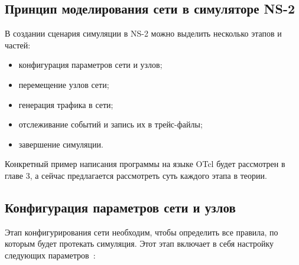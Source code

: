 \subsection{Принцип моделирования сети в симуляторе NS-2}

В создании сценария симуляции в NS-2 можно выделить несколько этапов и частей:

\begin{itemize}
  \item конфигурация параметров сети и узлов;
  \item перемещение узлов сети;
  \item генерация трафика в сети;
  \item отслеживание событий и запись их в трейс-файлы;
  \item завершение симуляции.
\end{itemize}

Конкретный пример написания программы на языке OTcl будет рассмотрен в главе 3, а сейчас предлагается рассмотреть суть каждого этапа в теории.

\subsection{Конфигурация параметров сети и узлов}

Этап конфигурирования сети необходим, чтобы определить все правила, по которым будет протекать симуляция. Этот этап включает в себя настройку следующих параметров~\cite{ns2_docs}:

